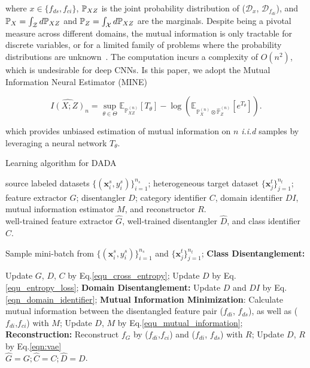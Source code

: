 \documentclass{article}
\begin{document}
where $x\in\{f_{ds},f_{ci}\}$, $\mathbb{P}_{XZ}$ is the joint probability distribution of ($\mathcal{D}_{x}$, $\mathcal{D}_{f_{di}}$), and $\mathbb{P}_X =
\int_{\mathcal{Z}} d\mathbb{P}_{XZ}$ and $\mathbb{P}_Z = \int_{\mathcal{X}} d\mathbb{P}_{XZ}$ are the marginals. Despite being a pivotal measure across different domains, the mutual information is only tractable for discrete variables, or for a limited family of problems where the probability distributions are unknown~\cite{mine}. The computation incurs a complexity of $O(n^2)$, which is undesirable for deep CNNs. Is this paper, we adopt the Mutual Information Neural Estimator (MINE)~\cite{mine}

\begin{equation}
    \label{donskeremp}
    \widehat{I(X;Z)}_n = 
    \sup_{\theta \in \Theta} \mathbb{E}_{\mathbb{P}^{(n)}_{XZ}}[T_\theta] - \log(\mathbb{E}_{\mathbb{P}^{(n)}_{X} \otimes \widehat{\mathbb{P}}^{(n)}_{Z}}[e^{T_\theta}]).
\end{equation} 

which provides unbiased estimation of mutual information on $n$ \textit{i.i.d} samples by leveraging a neural network $T_\theta$. 




\begin{algorithm}[t]			
	\caption{Learning algorithm for DADA} \label{alg_DADA}
	\begin{small}
		\hspace*{0.02in}{\bf Input:} source labeled datasets $\{(\mathbf{x}_i^s,y^s_i)\}_{i=1}^{n_s}$; heterogeneous target dataset $\{\mathbf{x}_j^t\}_{j=1}^{n_t}$; feature extractor $G$; disentangler $D$; category identifier $C$, domain identifier $DI$, mutual information estimator $M$, and reconstructor $R$.\\
		\hspace*{0.02in}{\bf Output:} well-trained feature extractor $\hat{G}$, well-trained disentangler $\hat{D}$, and class identifier $\hat{C}$.
		\begin{algorithmic}[1]
			\State Sample mini-batch from $\{(\mathbf{x}_i^s,y^s_i)\}_{i=1}^{n_s}$ and $\{\mathbf{x}_j^t\}_{j=1}^{n_t}$;
			\State \textbf{Class Disentanglement:}
			
			\State Update $G$, $D$, $C$ by Eq.\ref{equ_cross_entropy};
			\State Update $D$ by Eq.\ref{equ_entropy_loss};
			\EndFor
			\State \textbf{Domain Disentanglement:}
			\State Update $D$ and $DI$ by Eq.\ref{eqn_domain_identifier};
			\State \textbf{Mutual Information Minimization}:
			\State Calculate mutual information between the disentangled feature pair ($f_{di}$, $f_{ds}$), as well as ($f_{di}$,$f_{ci}$) with $M$;
			\State Update $D$, $M$ by Eq.\ref{equ_mutual_information};
			\State \textbf{Reconstruction:}
			\State Reconstruct $f_G$ by ($f_{di}$,$f_{ci}$) and ($f_{di}$, $f_{ds}$) with $R$;
			\State Update $D$, $R$ by Eq.\ref{eqn:vae}
			\EndWhile \\
			\Return $\hat{G} = G; \hat{C} = C; \hat{D} = D$.
		\end{algorithmic}
	\end{small}
\end{algorithm}
\end{document}
